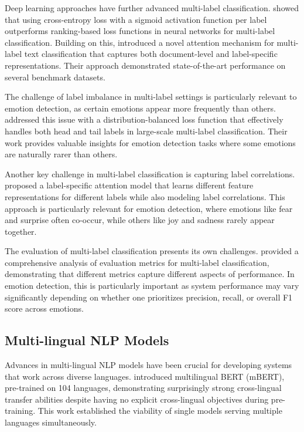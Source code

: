 \documentclass[a4paper,12pt]{extarticle}
\begin{document}
Deep learning approaches have further advanced multi-label classification. \cite{nam2014large} showed that using cross-entropy loss with a sigmoid activation function per label outperforms ranking-based loss functions in neural networks for multi-label classification. Building on this, \cite{chen2019multi} introduced a novel attention mechanism for multi-label text classification that captures both document-level and label-specific representations. Their approach demonstrated state-of-the-art performance on several benchmark datasets.

The challenge of label imbalance in multi-label settings is particularly relevant to emotion detection, as certain emotions appear more frequently than others. \cite{wu2020distribution} addressed this issue with a distribution-balanced loss function that effectively handles both head and tail labels in large-scale multi-label classification. Their work provides valuable insights for emotion detection tasks where some emotions are naturally rarer than others.

Another key challenge in multi-label classification is capturing label correlations. \cite{yeh2017learning} proposed a label-specific attention model that learns different feature representations for different labels while also modeling label correlations. This approach is particularly relevant for emotion detection, where emotions like fear and surprise often co-occur, while others like joy and sadness rarely appear together.

The evaluation of multi-label classification presents its own challenges. \cite{sorower2010literature} provided a comprehensive analysis of evaluation metrics for multi-label classification, demonstrating that different metrics capture different aspects of performance. In emotion detection, this is particularly important as system performance may vary significantly depending on whether one prioritizes precision, recall, or overall F1 score across emotions.

\subsection{Multi-lingual NLP Models}

Advances in multi-lingual NLP models have been crucial for developing systems that work across diverse languages. \cite{devlin2019bert} introduced multilingual BERT (mBERT), pre-trained on 104 languages, demonstrating surprisingly strong cross-lingual transfer abilities despite having no explicit cross-lingual objectives during pre-training. This work established the viability of single models serving multiple languages simultaneously.
\end{document}
